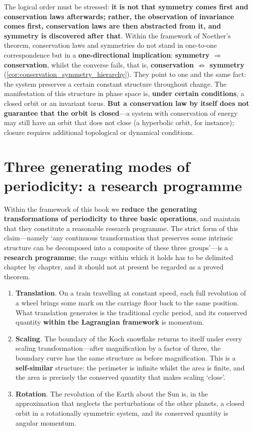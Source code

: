 The logical order must be stressed: \textbf{it is not that symmetry comes first and conservation laws afterwards; rather, the observation of invariance comes first, conservation laws are then abstracted from it, and symmetry is discovered after that}. Within the framework of Noether's theorem, conservation laws and symmetries do not stand in one-to-one correspondence but in a \textbf{one-directional implication}: \textbf{symmetry $\Rightarrow$ conservation}, whilst the converse fails, that is, \textbf{conservation $\nRightarrow$ symmetry} (\cref{cor:conservation_symmetry_hierarchy}). They point to one and the same fact: the system preserves a certain constant structure throughout change. The manifestation of this structure in phase space is, \textbf{under certain conditions}, a closed orbit or an invariant torus. \textbf{But a conservation law by itself does not guarantee that the orbit is closed}---a system with conservation of energy may still have an orbit that does not close (a hyperbolic orbit, for instance); closure requires additional topological or dynamical conditions.

\section*{Three generating modes of periodicity: a research programme}

Within the framework of this book we \textbf{reduce the generating transformations of periodicity to three basic operations}, and maintain that they constitute a reasonable research programme. The strict form of this claim---namely `any continuous transformation that preserves some intrinsic structure can be decomposed into a composite of these three groups'---is a \textbf{research programme}; the range within which it holds has to be delimited chapter by chapter, and it should not at present be regarded as a proved theorem.

\begin{enumerate}[leftmargin=2em, label={(\arabic*)}]
    \item \textbf{Translation}. On a train travelling at constant speed, each full revolution of a wheel brings some mark on the carriage floor back to the same position. What translation generates is the traditional cyclic period, and its conserved quantity \textbf{within the Lagrangian framework} is momentum.
    \item \textbf{Scaling}. The boundary of the Koch snowflake returns to itself under every scaling transformation---after magnification by a factor of three, the boundary curve has the same structure as before magnification. This is a \textbf{self-similar} structure: the perimeter is infinite whilst the area is finite, and the area is precisely the conserved quantity that makes scaling `close'.
    \item \textbf{Rotation}. The revolution of the Earth about the Sun is, in the approximation that neglects the perturbations of the other planets, a closed orbit in a rotationally symmetric system, and its conserved quantity is angular momentum.
\end{enumerate}

